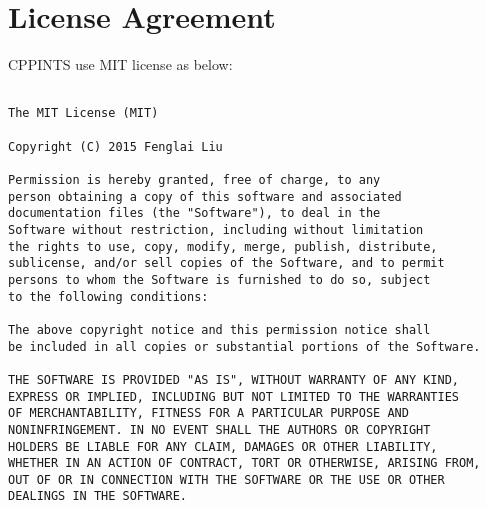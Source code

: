 \section{License Agreement}

CPPINTS use MIT license as below:

\newpage

\begin{verbatim}
 
The MIT License (MIT)

Copyright (C) 2015 Fenglai Liu 

Permission is hereby granted, free of charge, to any 
person obtaining a copy of this software and associated 
documentation files (the "Software"), to deal in the 
Software without restriction, including without limitation 
the rights to use, copy, modify, merge, publish, distribute, 
sublicense, and/or sell copies of the Software, and to permit 
persons to whom the Software is furnished to do so, subject 
to the following conditions:

The above copyright notice and this permission notice shall 
be included in all copies or substantial portions of the Software.

THE SOFTWARE IS PROVIDED "AS IS", WITHOUT WARRANTY OF ANY KIND, 
EXPRESS OR IMPLIED, INCLUDING BUT NOT LIMITED TO THE WARRANTIES 
OF MERCHANTABILITY, FITNESS FOR A PARTICULAR PURPOSE AND 
NONINFRINGEMENT. IN NO EVENT SHALL THE AUTHORS OR COPYRIGHT 
HOLDERS BE LIABLE FOR ANY CLAIM, DAMAGES OR OTHER LIABILITY, 
WHETHER IN AN ACTION OF CONTRACT, TORT OR OTHERWISE, ARISING FROM,
OUT OF OR IN CONNECTION WITH THE SOFTWARE OR THE USE OR OTHER 
DEALINGS IN THE SOFTWARE.
\end{verbatim}
